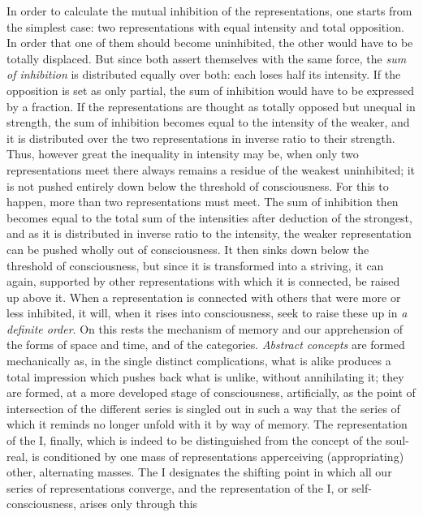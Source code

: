 In order to calculate the mutual inhibition of the representations, one
starts from the simplest case: two representations with equal intensity
and total opposition. In order that one of them should become
uninhibited, the other would have to be totally displaced. But since both
assert themselves with the same force, the \emph{sum of inhibition} is
distributed equally over both: each loses half its intensity. If the
opposition is set as only partial, the sum of inhibition
would have to be expressed by a fraction. If the
representations are thought as totally opposed but unequal in strength,
the sum of inhibition becomes equal to the intensity of the weaker, and
it is distributed over the two representations in inverse ratio to their
strength. Thus, however great the inequality in intensity may be, when
only two representations meet there always remains a residue of the
weakest uninhibited; it is not pushed entirely down below the threshold
of consciousness. For this to happen, more than two representations must
meet. The sum of inhibition then becomes equal to the total sum of the
intensities after deduction of the strongest, and as it is distributed
in inverse ratio to the intensity, the weaker representation can be
pushed wholly out of consciousness. It then sinks down below the
threshold of consciousness, but since it is transformed into a striving,
it can again, supported by other representations with which it is
connected, be raised up above it. When a representation is connected with
others that were more or less inhibited, it will, when it rises into
consciousness, seek to raise these up in \emph{a definite order}. On this
rests the mechanism of memory and our apprehension of the forms of space
and time, and of the categories. \emph{Abstract concepts} are formed
mechanically as, in the single distinct complications, what is alike
produces a total impression which pushes back what is unlike, without
annihilating it; they are formed, at a more developed stage of
consciousness, artificially, as the point of intersection of the
different series is singled out in such a way that the series of which it
reminds no longer unfold with it by way of memory. The representation of
the I, finally, which is indeed to be distinguished from the concept of
the soul-real, is conditioned by one mass of representations apperceiving
(appropriating) other, alternating masses. The I designates the shifting
point in which all our series of representations converge, and the
representation of the I, or self-consciousness, arises only through this
